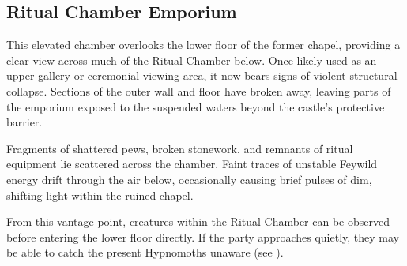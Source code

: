 \subsection*{ Ritual Chamber Emporium}
{\entryfont This elevated chamber overlooks the lower floor of the former chapel, providing a clear view across much of the Ritual Chamber below. Once likely used as an upper gallery or ceremonial viewing area, it now bears signs of violent structural collapse. Sections of the outer wall and floor have broken away, leaving parts of the emporium exposed to the suspended waters beyond the castle's protective barrier.

Fragments of shattered pews, broken stonework, and remnants of ritual equipment lie scattered across the chamber. Faint traces of unstable Feywild energy drift through the air below, occasionally causing brief pulses of dim, shifting light within the ruined chapel.

From this vantage point, creatures within the Ritual Chamber can be observed before entering the lower floor directly. If the party approaches quietly, they may be able to catch the present Hypnomoths unaware (see \hyperref[encounter:BeautifulDanger]{}).}
\clearpage
